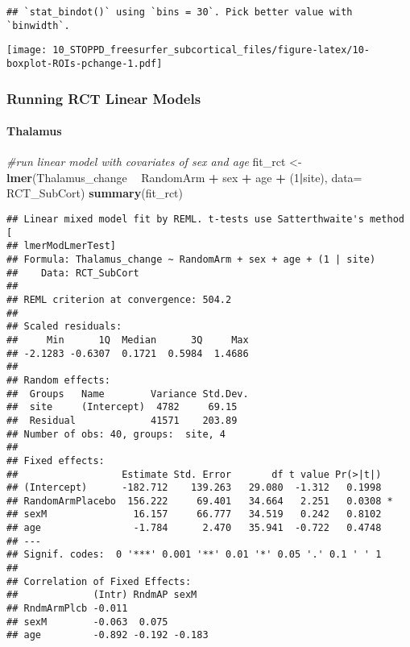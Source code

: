 \documentclass[]{article}
\newenvironment{Shaded}{\begin{snugshade}}{\end{snugshade}}
\newcommand{\KeywordTok}[1]{\textcolor[rgb]{0.13,0.29,0.53}{\textbf{#1}}}
\newcommand{\DataTypeTok}[1]{\textcolor[rgb]{0.13,0.29,0.53}{#1}}
\newcommand{\DecValTok}[1]{\textcolor[rgb]{0.00,0.00,0.81}{#1}}
\newcommand{\StringTok}[1]{\textcolor[rgb]{0.31,0.60,0.02}{#1}}
\newcommand{\CommentTok}[1]{\textcolor[rgb]{0.56,0.35,0.01}{\textit{#1}}}
\newcommand{\OperatorTok}[1]{\textcolor[rgb]{0.81,0.36,0.00}{\textbf{#1}}}
\newcommand{\NormalTok}[1]{#1}
\let\oldparagraph\paragraph
\renewcommand{\paragraph}[1]{\oldparagraph{#1}\mbox{}}
\theoremstyle{definition}
\theoremstyle{definition}
\theoremstyle{definition}
\theoremstyle{remark}
\begin{document}
\begin{verbatim}
## `stat_bindot()` using `bins = 30`. Pick better value with `binwidth`.
\end{verbatim}

\texttt{[image: 10\_STOPPD\_freesurfer\_subcortical\_files/figure-latex/10-boxplot-ROIs-pchange-1.pdf]}

\subsubsection{Running RCT Linear
Models}\label{running-rct-linear-models}

\paragraph{Thalamus}\label{thalamus}

\begin{Shaded}
\begin{Highlighting}[]
\CommentTok{#run linear model with covariates of sex and age}
\NormalTok{  fit_rct <-}\StringTok{ }\KeywordTok{lmer}\NormalTok{(Thalamus_change }\OperatorTok{~}\StringTok{ }\NormalTok{RandomArm }\OperatorTok{+}\StringTok{ }\NormalTok{sex }\OperatorTok{+}\StringTok{ }\NormalTok{age }\OperatorTok{+}\StringTok{ }\NormalTok{(}\DecValTok{1}\OperatorTok{|}\NormalTok{site), }\DataTypeTok{data=}\NormalTok{ RCT_SubCort)}
  \KeywordTok{summary}\NormalTok{(fit_rct)}
\end{Highlighting}
\end{Shaded}

\begin{verbatim}
## Linear mixed model fit by REML. t-tests use Satterthwaite's method [
## lmerModLmerTest]
## Formula: Thalamus_change ~ RandomArm + sex + age + (1 | site)
##    Data: RCT_SubCort
## 
## REML criterion at convergence: 504.2
## 
## Scaled residuals: 
##     Min      1Q  Median      3Q     Max 
## -2.1283 -0.6307  0.1721  0.5984  1.4686 
## 
## Random effects:
##  Groups   Name        Variance Std.Dev.
##  site     (Intercept)  4782     69.15  
##  Residual             41571    203.89  
## Number of obs: 40, groups:  site, 4
## 
## Fixed effects:
##                  Estimate Std. Error       df t value Pr(>|t|)  
## (Intercept)      -182.712    139.263   29.080  -1.312   0.1998  
## RandomArmPlacebo  156.222     69.401   34.664   2.251   0.0308 *
## sexM               16.157     66.777   34.519   0.242   0.8102  
## age                -1.784      2.470   35.941  -0.722   0.4748  
## ---
## Signif. codes:  0 '***' 0.001 '**' 0.01 '*' 0.05 '.' 0.1 ' ' 1
## 
## Correlation of Fixed Effects:
##             (Intr) RndmAP sexM  
## RndmArmPlcb -0.011              
## sexM        -0.063  0.075       
## age         -0.892 -0.192 -0.183
\end{verbatim}
\end{document}
